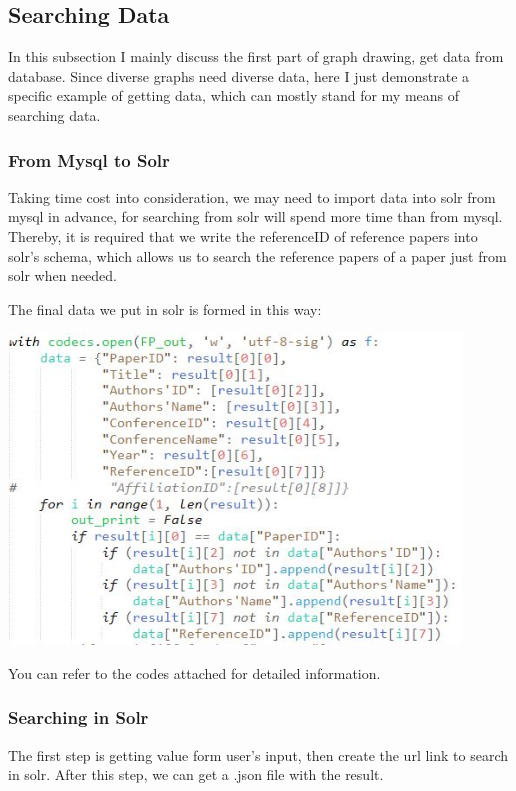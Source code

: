 \documentclass[10pt,twoside,a4paper,titlepage]{article}
\begin{document}
	\subsection{Searching Data}
		\par In this subsection I mainly discuss the first part of graph drawing, get data from database. Since diverse graphs need diverse data, here I just demonstrate a specific example of getting data, which can mostly stand for my means of searching data.
		\subsubsection{From Mysql to Solr}
			\par Taking time cost into consideration, we may need to import data into solr from mysql in advance, for searching from solr will spend more time than from mysql. Thereby, it is required that we write the referenceID of reference papers into solr's schema, which allows us to search the reference papers of a paper just from solr when needed.
			\par The final data we put in solr is formed in this way:\par
			\includegraphics[width=0.9\textwidth]{gjl/formdata.jpg}\newline\par
		You can refer to the codes attached for detailed information.
		\subsubsection{Searching in Solr}
			\par The first step is getting value form user's input, then create the url link to search in solr. After this step, we can get a .json file with the result.
\end{document}
